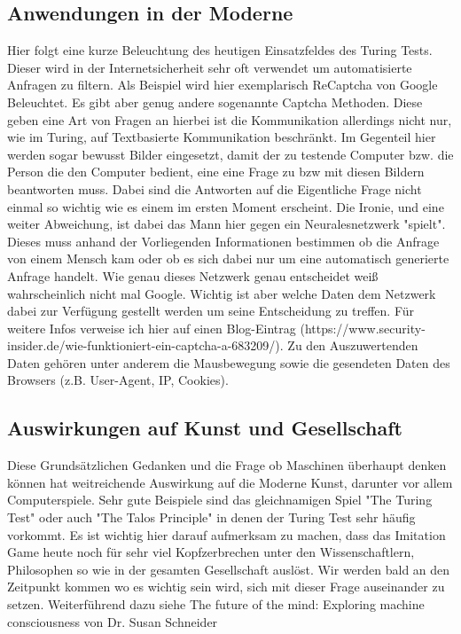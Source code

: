 \subsection{Anwendungen in der Moderne}
Hier folgt eine kurze Beleuchtung des heutigen Einsatzfeldes des Turing Tests. Dieser wird in der Internetsicherheit sehr oft verwendet um automatisierte Anfragen zu filtern. Als Beispiel wird hier exemplarisch ReCaptcha von Google Beleuchtet. Es gibt aber genug andere sogenannte Captcha Methoden. Diese geben eine Art von Fragen an hierbei ist die Kommunikation allerdings nicht nur, wie im Turing, auf Textbasierte Kommunikation beschränkt. Im Gegenteil hier werden sogar bewusst Bilder eingesetzt, damit der zu testende Computer bzw. die Person die den Computer bedient, eine eine Frage zu bzw mit diesen Bildern beantworten muss. Dabei sind die Antworten auf die Eigentliche Frage nicht einmal so wichtig wie es einem im ersten Moment erscheint. Die Ironie, und eine weiter Abweichung, ist dabei das Mann hier gegen ein Neuralesnetzwerk "spielt". Dieses muss anhand der Vorliegenden Informationen bestimmen ob die Anfrage von einem Mensch kam oder ob es sich dabei nur um eine automatisch generierte Anfrage handelt. Wie genau dieses Netzwerk genau entscheidet weiß wahrscheinlich nicht mal Google. Wichtig ist aber welche Daten dem Netzwerk dabei zur Verfügung gestellt werden um seine Entscheidung zu treffen. Für weitere Infos verweise ich hier auf einen Blog-Eintrag (https://www.security-insider.de/wie-funktioniert-ein-captcha-a-683209/). Zu den Auszuwertenden Daten gehören unter anderem die Mausbewegung sowie die gesendeten Daten des Browsers (z.B. User-Agent, IP, Cookies).
\subsection{Auswirkungen auf Kunst und Gesellschaft}
Diese Grundsätzlichen Gedanken und die Frage ob Maschinen überhaupt denken können hat weitreichende Auswirkung auf die Moderne Kunst, darunter vor allem Computerspiele. Sehr gute Beispiele sind das gleichnamigen Spiel "The Turing Test" oder auch "The Talos Principle" in denen der Turing Test sehr häufig vorkommt. Es ist wichtig hier darauf aufmerksam zu machen, dass das Imitation Game heute noch für sehr viel Kopfzerbrechen unter den Wissenschaftlern, Philosophen so wie in der gesamten Gesellschaft auslöst. Wir werden bald an den Zeitpunkt kommen wo es wichtig sein wird, sich mit dieser Frage auseinander zu setzen. Weiterführend dazu siehe The future of the mind: Exploring machine consciousness von Dr. Susan Schneider\cite{explorecons}

